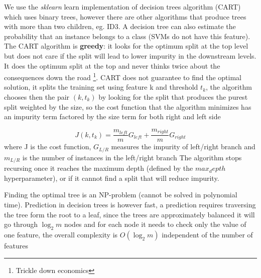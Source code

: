 \documentclass[11pt]{article}
\theoremstyle{definition}
\theoremstyle{remark}
\begin{document}
We use the \emph{sklearn} learn implementation of decision trees algorithm (CART) which uses binary trees, however there are other algorithms that produce trees with more than two children, eg. ID3. A decision tree can also estimate the probability that an instance belongs to a class (SVMs do not have this feature).
The CART algorithm is \textbf{greedy}: it looks for the optimum split at the top level but does not care if the split will lead to lower impurity in the downstream levels. It does the optimum split at the top and never thinks twice about the consequences down the road \footnote{Trickle down economics}. CART does not guarantee to find the optimal solution, it splits the training set using feature k and threshold $t_k$, the algorithm chooses then the pair $(k,t_k)$ by looking for the split that produces the purest split weighted by the size, so the cost function that the algorithm minimizes has an impurity term factored by the size term for both right and left side 

\begin{equation}\label{eq:cart}
J(k,t_k) = \frac{m_{left}}{m}G_{left} + \frac{m_{right}}{m}G_{right}
\end{equation}
where J is the cost function, $G_{L/R}$ measures the impurity of left/right branch and $m_{L/R}$ is the number of instances in the left/right branch 
The algorithm stops recursing once it reaches the maximum depth (defined by the $max_depth$ hyperparameter), or if it cannot find a split that will reduce impurity. 

Finding the optimal tree is an NP-problem (cannot be solved in polynomial time). Prediction in decision trees is however fast, a prediction requires traversing the tree form the root to a leaf, since the trees are approximately balanced it will go through $\log_{2}m$ nodes and for each node it needs to check only the value of one feature, the overall complexity is $O(\log_{2}m)$ independent of the number of features
\end{document}
